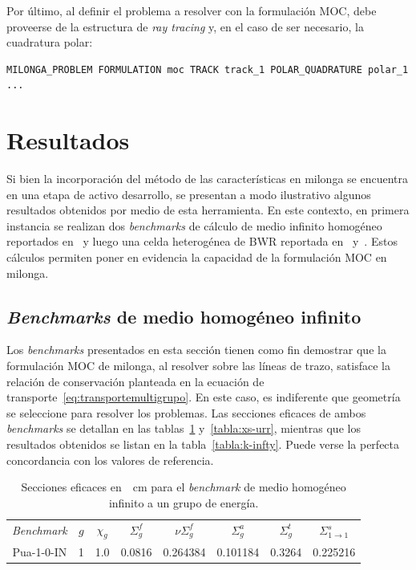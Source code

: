 \documentclass[11pt]{article}
\numberwithin{equation}{section}
\begin{document}
Por \'ultimo, al definir el problema a resolver con la formulación MOC, debe proveerse de la estructura de \emph{ray tracing} y, en el caso de ser necesario, la cuadratura polar:

\begin{lstlisting}[style=wasora]
MILONGA_PROBLEM FORMULATION moc TRACK track_1 POLAR_QUADRATURE polar_1 ...
\end{lstlisting}


\section{Resultados}

Si bien la incorporaci\'on del m\'etodo de las características en milonga se encuentra en una etapa de activo desarrollo, se presentan a modo ilustrativo algunos resultados obtenidos por medio de esta herramienta. En este contexto, en primera instancia se realizan dos \emph{benchmarks} de c\'alculo de medio infinito homog\'eneo reportados en~\cite{sood} y luego una celda heterog\'enea de BWR reportada en~\cite{hong} y~\cite{Mazumdar}. Estos c\'alculos permiten poner en evidencia la capacidad de la formulación MOC en milonga.

\subsection{\emph{Benchmarks} de medio homog\'eneo infinito}

Los \emph{benchmarks} presentados en esta sección tienen como fin demostrar que la formulación MOC de milonga, al resolver sobre las l\'ineas de trazo, satisface la relaci\'on de conservaci\'on planteada en la ecuación de transporte~\eqref{eq:transportemultigrupo}. En este caso, es indiferente que geometr\'ia se seleccione para resolver los problemas. Las secciones eficaces de ambos \emph{benchmarks} se detallan en las tablas~\ref{tabla:xs-pua} y~\ref{tabla:xs-urr}, mientras que los resultados obtenidos se listan en la tabla~\ref{tabla:k-infty}. Puede verse la perfecta concordancia con los valores de referencia.

{
\begin{table}[h!]
\begin{center}
\begin{tabular}{cccccccc}
\emph{Benchmark}  & $g$ & $\chi_g$ & $\Sigma^{f}_g$ & $\nu\Sigma^{f}_g$ & $\Sigma^{a}_g$ & $\Sigma^{t}_g$ & $\Sigma^s_{1 \rightarrow 1}$ \\
Pua-1-0-IN & \num{1} & \num{1.0} & \num{0.0816} & \num{0.264384} & \num{0.101184} & \num{0.3264} & \num{0.225216}
\end{tabular}
\caption{\label{tabla:xs-pua} Secciones eficaces en~\si{\per\centi\metre} para el \emph{benchmark} de medio homogéneo infinito a un grupo de energía.}
\end{center}
\end{table}
}
\end{document}
